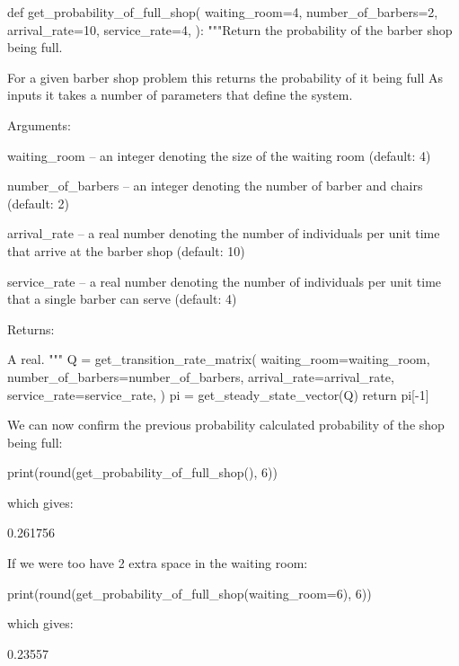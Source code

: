 \begin{pyin}
def get_probability_of_full_shop(
    waiting_room=4,
    number_of_barbers=2,
    arrival_rate=10,
    service_rate=4,
):
    """Return the probability of the barber shop being full.

    For a given barber shop problem this returns the
    probability of it being full As inputs it takes a
    number of parameters that define the system.

    Arguments:

    waiting_room --  an integer denoting the size of
                     the waiting room (default: 4)

    number_of_barbers --  an integer denoting the number
                          of barber and chairs
                          (default: 2)

    arrival_rate -- a real number denoting the number of
                    individuals per unit time that arrive
                    at the barber shop (default: 10)

    service_rate -- a real number denoting the number of
                    individuals per unit time that a single
                    barber can serve (default: 4)

    Returns:

    A real.
    """
    Q = get_transition_rate_matrix(
        waiting_room=waiting_room,
        number_of_barbers=number_of_barbers,
        arrival_rate=arrival_rate,
        service_rate=service_rate,
    )
    pi = get_steady_state_vector(Q)
    return pi[-1]
\end{pyin}

We can now confirm the previous probability calculated probability of the shop
being full:

\begin{pyin}
print(round(get_probability_of_full_shop(), 6))
\end{pyin}

which gives:

\begin{pyout}
0.261756
\end{pyout}

If we were too have 2 extra space in the waiting room:

\begin{pyin}
print(round(get_probability_of_full_shop(waiting_room=6), 6))
\end{pyin}

which gives:

\begin{pyout}
0.23557
\end{pyout}

